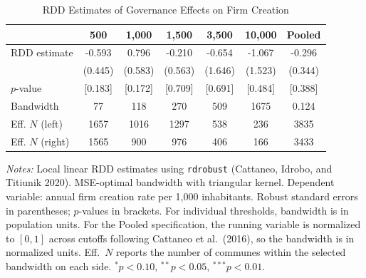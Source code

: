 \begin{table}[t]
\centering
\caption{RDD Estimates of Governance Effects on Firm Creation}
\label{tab:rdd_main}
\begin{tabular}{lcccccc}
\hline\hline
 & 500 & 1,000 & 1,500 & 3,500 & 10,000 & Pooled \\
\hline
RDD estimate & -0.593 & 0.796 & -0.210 & -0.654 & -1.067 & -0.296 \\
 & (0.445) & (0.583) & (0.563) & (1.646) & (1.523) & (0.344) \\
$p$-value & [0.183] & [0.172] & [0.709] & [0.691] & [0.484] & [0.388] \\
\hline
Bandwidth & 77 & 118 & 270 & 509 & 1675 & 0.124 \\
Eff. $N$ (left) & 1657 & 1016 & 1297 & 538 & 236 & 3835 \\
Eff. $N$ (right) & 1565 & 900 & 976 & 406 & 166 & 3433 \\
\hline\hline
\end{tabular}
\begin{tablenotes}\small
\item \textit{Notes:} Local linear RDD estimates using \texttt{rdrobust} (Cattaneo, Idrobo, and Titiunik 2020). MSE-optimal bandwidth with triangular kernel. Dependent variable: annual firm creation rate per 1,000 inhabitants. Robust standard errors in parentheses; $p$-values in brackets. For individual thresholds, bandwidth is in population units. For the Pooled specification, the running variable is normalized to $[0, 1]$ across cutoffs following Cattaneo et al.\ (2016), so the bandwidth is in normalized units. Eff.\ $N$ reports the number of communes within the selected bandwidth on each side. $^{*}p<0.10$, $^{**}p<0.05$, $^{***}p<0.01$.
\end{tablenotes}
\end{table}
